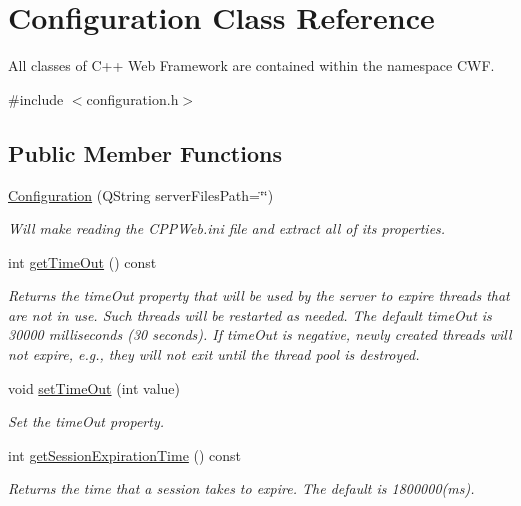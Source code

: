 \hypertarget{class_configuration}{}\section{Configuration Class Reference}
\label{class_configuration}


All classes of C++ Web Framework are contained within the namespace C\+WF.  




{\ttfamily \#include $<$configuration.\+h$>$}

\subsection*{Public Member Functions}
\begin{DoxyCompactItemize}
\item 
\mbox{\hyperlink{class_configuration_af5d72b2e949b80b291b1013268cff405}{Configuration}} (Q\+String server\+Files\+Path=\char`\"{}\char`\"{})
\begin{DoxyCompactList}\small\item\em Will make reading the C\+P\+P\+Web.\+ini file and extract all of its properties. \end{DoxyCompactList}\item 
int \mbox{\hyperlink{class_configuration_a3cd126ebe20117c04b4d38797e06551d}{get\+Time\+Out}} () const
\begin{DoxyCompactList}\small\item\em Returns the time\+Out property that will be used by the server to expire threads that are not in use. Such threads will be restarted as needed. The default time\+Out is 30000 milliseconds (30 seconds). If time\+Out is negative, newly created threads will not expire, e.\+g., they will not exit until the thread pool is destroyed. \end{DoxyCompactList}\item 
void \mbox{\hyperlink{class_configuration_a4fc1c685775b37e7b553c3393f1b2998}{set\+Time\+Out}} (int value)
\begin{DoxyCompactList}\small\item\em Set the time\+Out property. \end{DoxyCompactList}\item 
int \mbox{\hyperlink{class_configuration_af14b4f22fdcdfc32fbcac712a9868fd4}{get\+Session\+Expiration\+Time}} () const
\begin{DoxyCompactList}\small\item\em Returns the time that a session takes to expire. The default is 1800000(ms). \end{DoxyCompactList}\item 

\end{DoxyCompactItemize}
